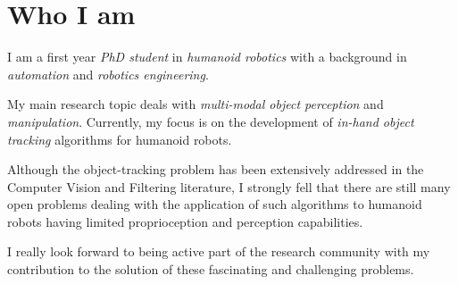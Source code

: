 \documentclass[11pt,a4paper,sans]{moderncv}        %
\begin{document}
\makecvtitle

\section{\textbf{Who I am}}
I am a first year \emph{PhD student} in \emph{humanoid robotics} with a background in \emph{automation} and \emph{robotics engineering}.
\par
My main research topic deals with \emph{multi-modal object perception} and \emph{manipulation}. Currently, my focus is on the development of \emph{in-hand object tracking} algorithms for humanoid robots. 
\par
Although the object-tracking problem has been extensively addressed in the Computer Vision and Filtering literature, I strongly fell that there are still many open problems dealing with the application of such algorithms to humanoid robots having limited proprioception and perception capabilities.
\par
I really look forward to being active part of the research community with my contribution to the solution of these fascinating and challenging problems.
\end{document}
